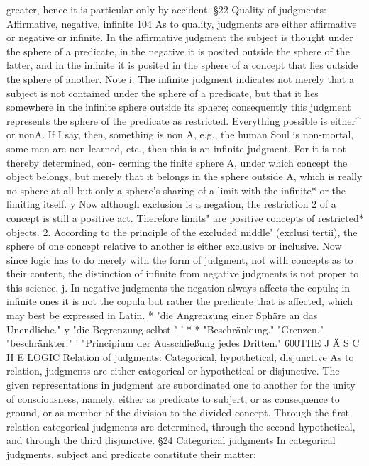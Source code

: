 greater, hence it is particular only by accident.
§22
Quality of judgments: Affirmative, negative, infinite
104
As to quality, judgments are either affirmative or negative or infinite. In the
affirmative judgment the subject is thought under the sphere of a predicate,
in the negative it is posited outside the sphere of the latter, and in the infinite
it is posited in the sphere of a concept that lies outside the sphere of
another.
Note i. The infinite judgment indicates not merely that a subject is not contained
under the sphere of a predicate, but that it lies somewhere in the infinite
sphere outside its sphere; consequently this judgment represents the
sphere of the predicate as restricted.
Everything possible is either^ or nonA. If I say, then, something is non
A, e.g., the human Soul is non-mortal, some men are non-learned, etc.,
then this is an infinite judgment. For it is not thereby determined, con-
cerning the finite sphere A, under which concept the object belongs, but
merely that it belongs in the sphere outside A, which is really no sphere at
all but only a sphere's sharing of a limit with the infinite* or the limiting
itself. y Now although exclusion is a negation, the restriction 2 of a concept
is still a positive act. Therefore limits" are positive concepts of restricted*
objects.
2. According to the principle of the excluded middle' (exclusi tertii), the
sphere of one concept relative to another is either exclusive or inclusive.
Now since logic has to do merely with the form of judgment, not with
concepts as to their content, the distinction of infinite from negative
judgments is not proper to this science.
j. In negative judgments the negation always affects the copula; in infinite
ones it is not the copula but rather the predicate that is affected, which
may best be expressed in Latin.
* "die Angrenzung einer Sphäre an das Unendliche."
y "die Begrenzung selbst."
'
*
* "Beschränkung."
"Grenzen."
"beschränkter."
' "Principium der Ausschließung jedes Dritten."
600THE J Ä S C H E LOGIC
Relation of judgments: Categorical, hypothetical, disjunctive
As to relation, judgments are either categorical or hypothetical or disjunctive.
The given representations in judgment are subordinated one to another
for the unity of consciousness, namely, either as predicate to subjert, or as
consequence to ground, or as member of the division to the divided concept.
Through the first relation categorical judgments are determined, through
the second hypothetical, and through the third disjunctive.
§24
Categorical judgments
In categorical judgments, subject and predicate constitute their matter;
